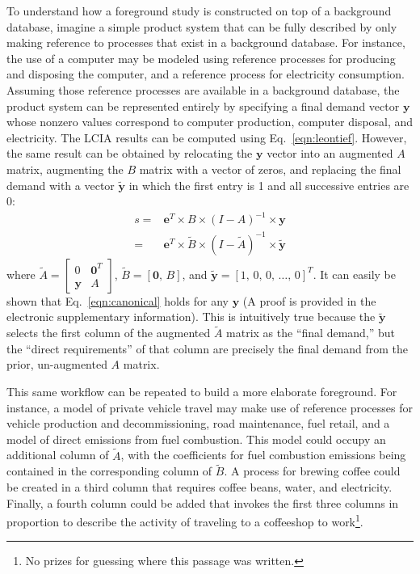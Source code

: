 To understand how a foreground study is constructed on top of a background database, imagine a simple product system that can be fully described by only making reference to processes that exist in a background database.  For instance, the use of a computer may be modeled using reference processes for producing and disposing the computer, and a reference process for electricity consumption.  Assuming those reference processes are available in a background database, the product system can be represented entirely by specifying a final demand vector $\mathbf{y}$ whose nonzero values correspond to computer production, computer disposal, and electricity.  The LCIA results can be computed using Eq.~\ref{eqn:leontief}.  However, the same result can be obtained by relocating the $\mathbf{y}$ vector into an augmented $A$ matrix, augmenting the $B$ matrix with a vector of zeros, and replacing the final demand with a vector $\tilde{\mathbf{y}}$ in which the first entry is 1 and all successive entries are 0:
\begin{equation}
  \begin{array}{cc}
s =& \mathbf{e}^T\times B\times\left(I-A\right)^{-1}\times\mathbf{y} \\
 =& \mathbf{e}^{T}\times\tilde{B}\times\left(I-\tilde{A}\right)^{-1}\times\tilde{\mathbf{y}}
  \end{array}
  \label{eqn:canonical}
\end{equation}
where
$\tilde{A} = \left[\begin{smallmatrix} 0 & \mathbf{0}^T \\ \mathbf{y} & A  \end{smallmatrix}\right]$,
$\tilde{B} = [ \mathbf{0},\, B ]$, and $\tilde{\mathbf{y}} =  [ 1,\, 0,\, 0 ,\,\ldots,\, 0]^{T}$.
It can easily be shown that Eq.~\ref{eqn:canonical} holds for any $\mathbf{y}$  (A proof is provided in the electronic supplementary information).  This is intuitively true because the $\tilde{\mathbf{y}}$ selects the first column of the augmented $\tilde{A}$ matrix as the ``final demand,'' but the ``direct requirements'' of that column are precisely the final demand from the prior, un-augmented $A$ matrix.  

This same workflow can be repeated to build a more elaborate foreground.  For instance, a model of private vehicle travel may make use of reference processes for vehicle production and decommissioning, road maintenance, fuel retail, and a model of direct emissions from fuel combustion.  This model could occupy an additional column of $\tilde{A}$, with the coefficients for fuel combustion emissions being contained in the corresponding column of $\tilde{B}$.  A process for brewing coffee could be created in a third column that requires coffee beans, water, and electricity. Finally, a fourth column could be added that invokes the first three columns in proportion to describe the activity of traveling to a coffeeshop to work\footnote{No prizes for guessing where this passage was written.}.

